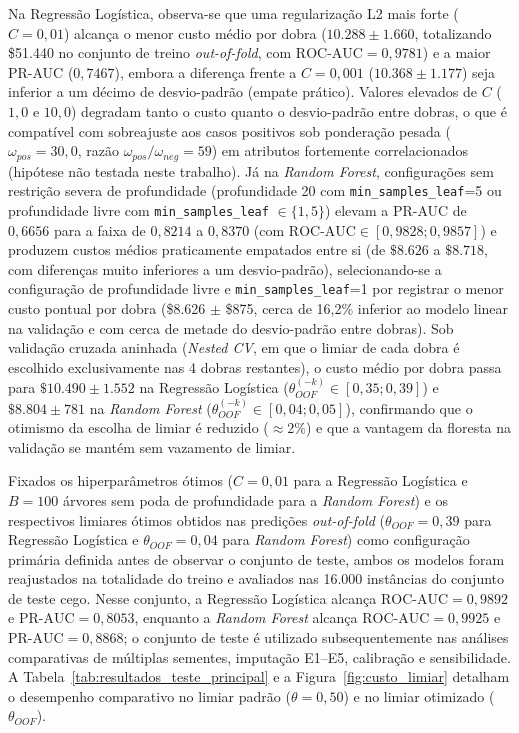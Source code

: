 \documentclass[conference]{IEEEtran}
\begin{document}
Na Regressão Logística, observa-se que uma regularização L2 mais forte ($C = 0{,}01$) alcança o menor custo médio por dobra ($10.288 \pm 1.660$, totalizando \$51.440 no conjunto de treino \textit{out-of-fold}, com $\text{ROC-AUC} = 0{,}9781$) e a maior PR-AUC ($0{,}7467$), embora a diferença frente a $C = 0{,}001$ ($10.368 \pm 1.177$) seja inferior a um décimo de desvio-padrão (empate prático). Valores elevados de $C$ ($1{,}0$ e $10{,}0$) degradam tanto o custo quanto o desvio-padrão entre dobras, o que é compatível com sobreajuste aos casos positivos sob ponderação pesada ($\omega_{pos} = 30{,}0$, razão $\omega_{pos}/\omega_{neg} = 59$) em atributos fortemente correlacionados (hipótese não testada neste trabalho). Já na \textit{Random Forest}, configurações sem restrição severa de profundidade (profundidade 20 com \texttt{min\_samples\_leaf}=5 ou profundidade livre com \texttt{min\_samples\_leaf} $\in \{1, 5\}$) elevam a PR-AUC de $0{,}6656$ para a faixa de $0{,}8214$ a $0{,}8370$ (com $\text{ROC-AUC} \in [0{,}9828; 0{,}9857]$) e produzem custos médios praticamente empatados entre si (de $\$8.626$ a $\$8.718$, com diferenças muito inferiores a um desvio-padrão), selecionando-se a configuração de profundidade livre e \texttt{min\_samples\_leaf}=1 por registrar o menor custo pontual por dobra (\$8.626 $\pm$ \$875, cerca de 16,2\% inferior ao modelo linear na validação e com cerca de metade do desvio-padrão entre dobras). Sob validação cruzada aninhada (\textit{Nested CV}, em que o limiar de cada dobra é escolhido exclusivamente nas 4 dobras restantes), o custo médio por dobra passa para $\$10.490 \pm 1.552$ na Regressão Logística ($\theta^{(-k)}_{OOF} \in [0{,}35; 0{,}39]$) e $\$8.804 \pm 781$ na \textit{Random Forest} ($\theta^{(-k)}_{OOF} \in [0{,}04; 0{,}05]$), confirmando que o otimismo da escolha de limiar é reduzido ($\approx 2\%$) e que a vantagem da floresta na validação se mantém sem vazamento de limiar.

Fixados os hiperparâmetros ótimos ($C=0{,}01$ para a Regressão Logística e $B=100$ árvores sem poda de profundidade para a \textit{Random Forest}) e os respectivos limiares ótimos obtidos nas predições \textit{out-of-fold} ($\theta_{OOF} = 0{,}39$ para Regressão Logística e $\theta_{OOF} = 0{,}04$ para \textit{Random Forest}) como configuração primária definida antes de observar o conjunto de teste, ambos os modelos foram reajustados na totalidade do treino e avaliados nas 16.000 instâncias do conjunto de teste cego. Nesse conjunto, a Regressão Logística alcança $\text{ROC-AUC} = 0{,}9892$ e $\text{PR-AUC} = 0{,}8053$, enquanto a \textit{Random Forest} alcança $\text{ROC-AUC} = 0{,}9925$ e $\text{PR-AUC} = 0{,}8868$; o conjunto de teste é utilizado subsequentemente nas análises comparativas de múltiplas sementes, imputação E1--E5, calibração e sensibilidade. A Tabela~\ref{tab:resultados_teste_principal} e a Figura~\ref{fig:custo_limiar} detalham o desempenho comparativo no limiar padrão ($\theta = 0{,}50$) e no limiar otimizado ($\theta_{OOF}$).
\end{document}
